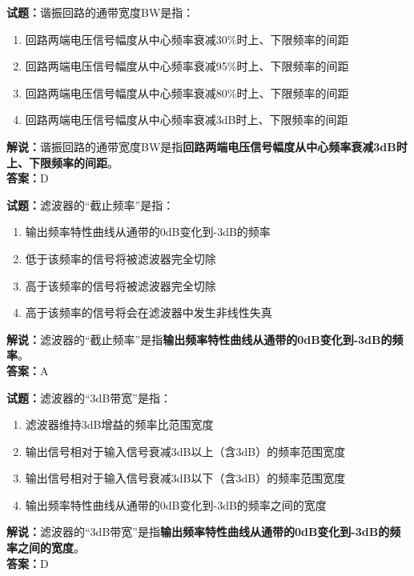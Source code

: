 \documentclass{ctexbook}
\begin{document}
\bigskip


\noindent\textbf{试题：}谐振回路的通带宽度BW是指：
\begin{enumerate}[leftmargin=3em]
\item 回路两端电压信号幅度从中心频率衰减30\%时上、下限频率的间距
\item 回路两端电压信号幅度从中心频率衰减95\%时上、下限频率的间距
\item 回路两端电压信号幅度从中心频率衰减80\%时上、下限频率的间距
\item 回路两端电压信号幅度从中心频率衰减3dB时上、下限频率的间距
\end{enumerate}
\noindent\textbf{解说：}谐振回路的通带宽度BW是指\textbf{回路两端电压信号幅度从中心频率衰减3dB时上、下限频率的间距}。\\\noindent\textbf{答案：}D



\bigskip


\noindent\textbf{试题：}滤波器的“截止频率”是指：
\begin{enumerate}[leftmargin=3em]
\item 输出频率特性曲线从通带的0dB变化到-3dB的频率
\item 低于该频率的信号将被滤波器完全切除
\item 高于该频率的信号将被滤波器完全切除
\item 高于该频率的信号将会在滤波器中发生非线性失真
\end{enumerate}
\noindent\textbf{解说：}滤波器的“截止频率”是指\textbf{输出频率特性曲线从通带的0dB变化到-3dB的频率}。\\\noindent\textbf{答案：}A



\bigskip


\noindent\textbf{试题：}滤波器的“3dB带宽”是指：
\begin{enumerate}[leftmargin=3em]
\item 滤波器维持3dB增益的频率比范围宽度
\item 输出信号相对于输入信号衰减3dB以上（含3dB）的频率范围宽度
\item 输出信号相对于输入信号衰减3dB以下（含3dB）的频率范围宽度
\item 输出频率特性曲线从通带的0dB变化到-3dB的频率之间的宽度
\end{enumerate}
\noindent\textbf{解说：}滤波器的“3dB带宽”是指\textbf{输出频率特性曲线从通带的0dB变化到-3dB的频率之间的宽度}。\\\noindent\textbf{答案：}D
\end{document}
